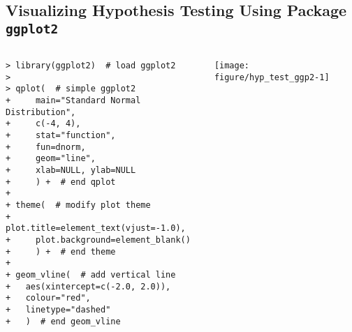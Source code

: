 \documentclass[10pt]{beamer}\usepackage[]{graphicx}\usepackage[]{color}
\makeatletter
\newenvironment{kframe}{%
 \def\at@end@of@kframe{}%
 \ifinner\ifhmode%
  \def\at@end@of@kframe{\end{minipage}}%
  \begin{minipage}{\columnwidth}%
 \fi\fi%
 \def\FrameCommand##1{\hskip\@totalleftmargin \hskip-\fboxsep
 \colorbox{shadecolor}{##1}\hskip-\fboxsep
     \hskip-\linewidth \hskip-\@totalleftmargin \hskip\columnwidth}%
 \MakeFramed {\advance\hsize-\width
   \@totalleftmargin\z@ \linewidth\hsize
   \@setminipage}}%
 {\par\unskip\endMakeFramed%
 \at@end@of@kframe}
\newenvironment{knitrout}{}{} %
\makeatother
\begin{document}
\subsection{Visualizing Hypothesis Testing Using Package \texttt{ggplot2}}
\begin{frame}[fragile,t]{\subsecname}
\vspace{-1em}
\begin{block}{}
  \begin{columns}[T]
\begin{knitrout}\scriptsize
{}\color{fgcolor}\begin{kframe}
\begin{verbatim}
> library(ggplot2)  # load ggplot2
> 
> qplot(  # simple ggplot2
+     main="Standard Normal Distribution",
+     c(-4, 4),
+     stat="function",
+     fun=dnorm,
+     geom="line",
+     xlab=NULL, ylab=NULL
+     ) +  # end qplot
+ 
+ theme(  # modify plot theme
+     plot.title=element_text(vjust=-1.0),
+     plot.background=element_blank()
+     ) +  # end theme
+ 
+ geom_vline(  # add vertical line
+   aes(xintercept=c(-2.0, 2.0)),
+   colour="red",
+   linetype="dashed"
+   )  # end geom_vline
\end{verbatim}
\end{kframe}
\end{knitrout}
      \hspace*{-1em}
      \texttt{[image: figure/hyp\_test\_ggp2-1]}
  \end{columns}
\end{block}

\end{frame}


\end{document}
